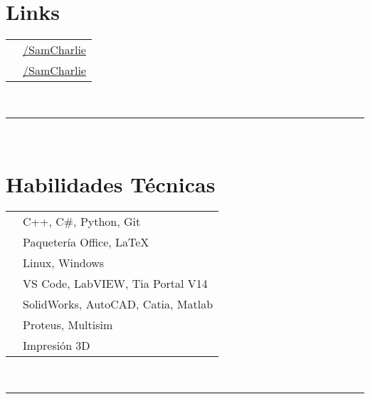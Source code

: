 \documentclass[oneside]{article}
\begin{document}
{\begin{minipage}[t][\textheight-2\fboxsep-2\fboxrule][t]{\dimexpr0.40\textwidth-2\fboxrule-2\fboxsep\relax}
        \section*{\large Links}
        \begin{tabular}{cl}
            \faLinkedin{} & \href{https://www.linkedin.com/in/samcharlie/}{/SamCharlie} \\
            \faGithub{}   & \href{https://github.com/SamCharlie}{/SamCharlie} \\
        \end{tabular}
        \vspace{10pt} \\
        \rule{\linewidth}{0.4pt} \\
        \section*{\large Habilidades Técnicas}
        \begin{tabularx}{\textwidth}{cY}
            \faCode{}        & C++, C\#, Python, Git\\
            \faFont{}        & Paquetería Office, \LaTeX\\
            \faDesktop{}     & Linux, Windows\\
            \faLaptopCode{}  & VS Code, LabVIEW, Tia Portal V14\\
            \faCogs{}        & SolidWorks, AutoCAD, Catia, Matlab\\
            \faBolt{}        & Proteus, Multisim\\
            \faToolbox{}     & Impresión 3D
        \end{tabularx}
        \vspace{1pt} \\
        \rule{\linewidth}{0.4pt}
    \end{minipage}
}
\end{document}

